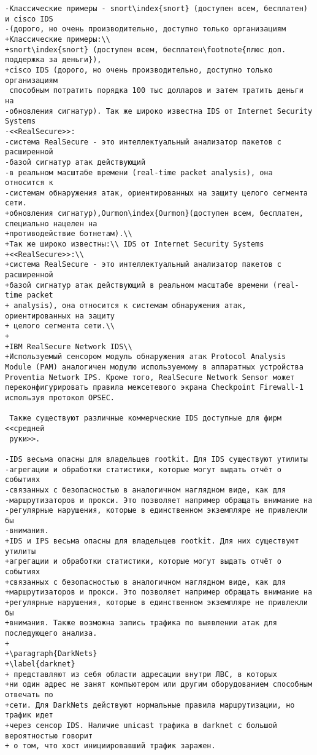 \begin{verbatim}
-Классические примеры - snort\index{snort} (доступен всем, бесплатен) и cisco IDS
-(дорого, но очень производительно, доступно только организациям
+Классические примеры:\\
+snort\index{snort} (доступен всем, бесплатен\footnote{плюс доп. поддержка за деньги}),
+cisco IDS (дорого, но очень производительно, доступно только организациям
 способным потратить порядка 100 тыс долларов и затем тратить деньги на
-обновления сигнатур). Так же широко известна IDS от Internet Security Systems
-<<RealSecure>>:
-система RealSecure - это интеллектуальный анализатор пакетов с расширенной
-базой сигнатур атак действующий
-в реальном масштабе времени (real-time packet analysis), она относится к
-системам обнаружения атак, ориентированных на защиту целого сегмента сети.
+обновления сигнатур),Ourmon\index{Ourmon}(доступен всем, бесплатен, специально нацелен на
+противодействие ботнетам).\\
+Так же широко известны:\\ IDS от Internet Security Systems
+<<RealSecure>>:\\
+система RealSecure - это интеллектуальный анализатор пакетов с расширенной
+базой сигнатур атак действующий в реальном масштабе времени (real-time packet
+ analysis), она относится к системам обнаружения атак, ориентированных на защиту
+ целого сегмента сети.\\
+
+IBM RealSecure Network IDS\\
+Используемый сенсором модуль обнаружения атак Protocol Analysis Module (PAM) аналогичен модулю используемому в аппаратных устройства Proventia Network IPS. Кроме того, RealSecure Network Sensor может переконфигурировать правила межсетевого экрана Checkpoint Firewall-1 используя протокол OPSEC.

 Также существуют различные коммерческие IDS доступные для фирм <<средней
 руки>>.

-IDS весьма опасны для владельцев rootkit. Для IDS существуют утилиты
-агрегации и обработки статистики, которые могут выдать отчёт о событиях
-связанных с безопасностью в аналогичном наглядном виде, как для
-маршрутизаторов и прокси. Это позволяет например обращать внимание на
-регулярные нарушения, которые в единственном экземпляре не привлекли бы
-внимания.
+IDS и IPS весьма опасны для владельцев rootkit. Для них существуют утилиты
+агрегации и обработки статистики, которые могут выдать отчёт о событиях
+связанных с безопасностью в аналогичном наглядном виде, как для
+маршрутизаторов и прокси. Это позволяет например обращать внимание на
+регулярные нарушения, которые в единственном экземпляре не привлекли бы
+внимания. Также возможна запись трафика по выявлении атак для последующего анализа.
+
+\paragraph{DarkNets}
+\label{darknet}
+ представляют из себя области адресации внутри ЛВС, в которых
+ни один адрес не занят компьютером или другим оборудованием способным отвечать по
+сети. Для DarkNets действуют нормальные правила маршрутизации, но трафик идет
+через сенсор IDS. Наличие unicast трафика в darknet с большой вероятностью говорит
+ о том, что хост инициировавший трафик заражен.


\end{verbatim}
